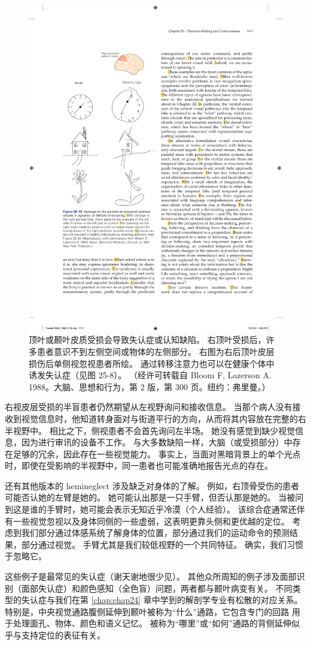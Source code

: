 \begin{figure}[htbp]
	\centering
	\includegraphics[width=0.5\linewidth]{chap56/fig_56_10}
	\caption{顶叶或颞叶皮质受损会导致失认症或认知缺陷。 右顶叶受损后，许多患者意识不到左侧空间或物体的左侧部分。 右图为右后顶叶皮层损伤后单侧视忽视患者所绘。 通过转移注意力也可以在健康个体中诱发失认症（见图 25-8）。 （经许可转载自 Bloom F, Lazerson A. 1988。大脑、思想和行为，第 2 版，第 300 页。纽约：弗里曼。）}
	\label{fig:56_10}
\end{figure}


右视皮层受损的半盲患者仍然期望从左视野询问和接收信息。
当那个病人没有接收到视觉信息时，他知道转身面对与街道平行的方向，从而将其内容放在完整的右半视野中。
相比之下，侧视患者不会首先询问左半场。
她没有感觉到缺少视觉信息，因为进行审讯的设备不工作。
与大多数缺陷一样，大脑（或受损部分）中存在足够的冗余，因此存在一些视觉能力。
事实上，当面对黑暗背景上的单个光点时，即使在受影响的半视野中，同一患者也可能准确地报告光点的存在。


还有其他版本的 hemineglect 涉及缺乏对身体的了解。
例如，右顶骨受伤的患者可能否认她的左臂是她的。 她可能认出那是一只手臂，但否认那是她的。
当被问到这是谁的手臂时，她可能会表示无知近乎冷漠（个人经验）。
该综合症通常还伴有一些视觉忽视以及身体同侧的一些虚弱，这表明更靠头侧和更优越的定位。
考虑到我们部分通过体感系统了解身体的位置，部分通过我们的运动命令的预测结果，部分通过视觉。
手臂尤其是我们较低视野的一个共同特征。
确实，我们习惯于忽略它。


这些例子是最常见的失认症（谢天谢地很少见）。
其他众所周知的例子涉及面部识别（面部失认症）和颜色感知（全色盲）问题，两者都与颞叶病变有关。
不同类型的失认症与我们在第 \ref{chap:chap24} 章中学到的解剖学专业有松散的对应关系。
特别是，中央视觉通路腹侧延伸到颞叶被称为“什么”通路，它包含专门的回路 用于处理面孔、物体、颜色和语义记忆。
被称为“哪里”或“如何”通路的背侧延伸似乎与支持定位的表征有关。


